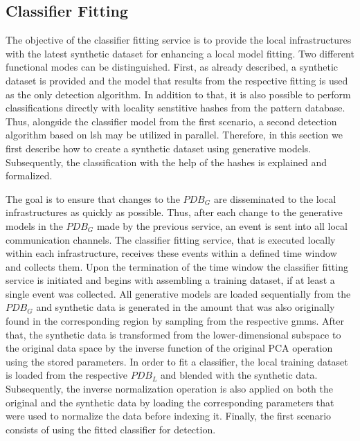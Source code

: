 \documentclass[../../main.tex]{subfiles}
\begin{document}
\subsection{Classifier Fitting} \label{subsec:classifier_fitting}

The objective of the classifier fitting service is to provide the local infrastructures with the latest synthetic dataset for enhancing a local model fitting. Two different functional modes can be distinguished. First, as already described, a synthetic dataset is provided and the model that results from the respective fitting is used as the only detection algorithm. In addition to that, it is also possible to perform classifications directly with locality senstitive hashes from the pattern database. Thus, alongside the classifier model from the first scenario, a second detection algorithm  based on \gls{lsh} may be utilized in parallel. Therefore, in this section we first describe how to create a synthetic dataset using generative models. Subsequently, the classification with the help of the hashes is explained and formalized.

The goal is to ensure that changes to the $PDB_G$ are disseminated to the local infrastructures as quickly as possible. Thus, after each change to the generative models in the $PDB_G$ made by the previous service, an event is sent into all local communication channels. The classifier fitting service, that is executed locally within each infrastructure, receives these events within a defined time window and collects them. Upon the termination of the time window the classifier fitting service is initiated and begins with assembling a training dataset, if at least a single event was collected. All generative models are loaded sequentially from the $PDB_G$ and synthetic data is generated in the amount that was also originally found in the corresponding region by sampling from the respective \glspl{gmm}. After that, the synthetic data is transformed from the lower-dimensional subspace to the original data space by the inverse function of the original PCA operation using the stored parameters. In order to fit a classifier, the local training dataset is loaded from the respective $PDB_L$ and blended with the synthetic data. Subsequently, the inverse normalization operation is also applied on both the original and the synthetic data by loading the corresponding parameters that were used to normalize the data before indexing it. Finally, the first scenario consists of using the fitted classifier for detection.
\end{document}

